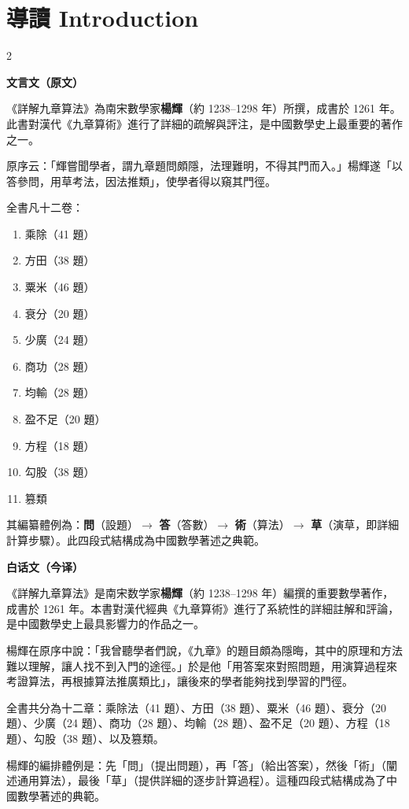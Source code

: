\documentclass[11pt,a4paper]{article}
\newcommand{\LeftLabel}{\begin{center}\textcolor{sectioncolor}{\small\textbf{文言文（原文）}}\end{center}\vspace{-0.5em}}
\newcommand{\RightLabel}{\begin{center}\textcolor{sectioncolor}{\small\textbf{白话文（今译）}}\end{center}\vspace{-0.5em}}
\begin{document}
\newpage
\tableofcontents
\newpage

\section{導讀 Introduction}

\begin{paracol}{2}
\LeftLabel

{
《詳解九章算法》為南宋數學家\textbf{楊輝}（約 1238--1298 年）所撰，成書於 1261 年。此書對漢代《九章算術》進行了詳細的疏解與評注，是中國數學史上最重要的著作之一。

原序云：「輝嘗聞學者，謂九章題問頗隱，法理難明，不得其門而入。」楊輝遂「以答參問，用草考法，因法推類」，使學者得以窺其門徑。

全書凡十二卷：
\begin{enumerate}[noitemsep,label=\arabic*.,leftmargin=1.5em]
\item 乘除（41 題）
\item 方田（38 題）
\item 粟米（46 題）
\item 衰分（20 題）
\item 少廣（24 題）
\item 商功（28 題）
\item 均輸（28 題）
\item 盈不足（20 題）
\item 方程（18 題）
\item 勾股（38 題）
\item 篡類
\end{enumerate}

其編纂體例為：\textbf{問}（設題）$\rightarrow$ \textbf{答}（答數）$\rightarrow$ \textbf{術}（算法）$\rightarrow$ \textbf{草}（演草，即詳細計算步驟）。此四段式結構成為中國數學著述之典範。
}

\switchcolumn
\RightLabel

{
《詳解九章算法》是南宋数学家\textbf{楊輝}（約 1238--1298 年）編撰的重要數學著作，成書於 1261 年。本書對漢代經典《九章算術》進行了系統性的詳細註解和評論，是中國數學史上最具影響力的作品之一。

楊輝在原序中說：「我曾聽學者們說，《九章》的題目頗為隱晦，其中的原理和方法難以理解，讓人找不到入門的途徑。」於是他「用答案來對照問題，用演算過程來考證算法，再根據算法推廣類比」，讓後來的學者能夠找到學習的門徑。

全書共分為十二章：乘除法（41 題）、方田（38 題）、粟米（46 題）、衰分（20 題）、少廣（24 題）、商功（28 題）、均輸（28 題）、盈不足（20 題）、方程（18 題）、勾股（38 題）、以及篡類。

楊輝的編排體例是：先「問」（提出問題），再「答」（給出答案），然後「術」（闡述通用算法），最後「草」（提供詳細的逐步計算過程）。這種四段式結構成為了中國數學著述的典範。
}

\end{paracol}
\end{document}
